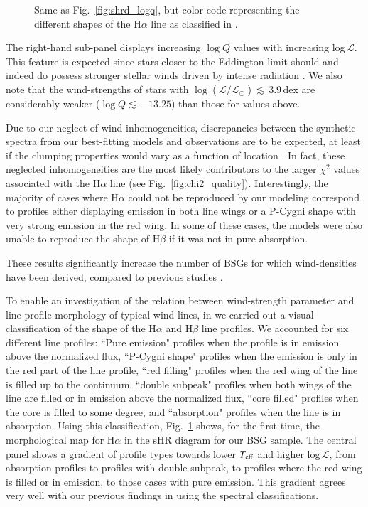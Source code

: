 \documentclass{aa}
\newcommand{\Teff}{\mbox{$T_{\rm eff}$}\xspace}
\newcommand{\logQ}{\mbox{$\log Q$}\xspace}
\newcommand{\logLs}{$\log (\mathcal{L}/\mathcal{L}_{\odot})$\xspace}
\newcommand{\Ls}{$ \mathcal{L}$\xspace}
\newcommand{\ls}{\mbox{$\lesssim$}\,}
\begin{document}
\begin{figure}[!t]
\centering
{}
\caption{Same as Fig.~\ref{fig:shrd_logq}, but color-code representing the different shapes of the H$\alpha$ line as classified in \citet[][see also labels within the bottom right inset]{deburgos23}.} 
\label{fig:shrd_logq_sep}
\end{figure}

The right-hand sub-panel displays increasing \logQ values with increasing log\,\Ls. This feature is expected since stars closer to the Eddington limit should and indeed do possess stronger stellar winds driven by intense radiation \citep[see, e.g.,][]{abbott80, pauldrach86}. We also note that the wind-strengths of stars with \logLs\ls3.9\,dex are considerably weaker (\logQ\ls$-13.25$) than those for values above.

Due to our neglect of wind inhomogeneities, discrepancies between the synthetic spectra from our best-fitting models and observations are to be expected, at least if the clumping properties would vary as a function of location \citep[which seems to be the case, e.g.,][]{najarro11}. In fact, these neglected inhomogeneities are the most likely contributors to the larger $\chi^{2}$ values associated with the H$\alpha$ line (see Fig.~\ref{fig:chi2_quality}). Interestingly, the majority of cases where H$\alpha$ could not be reproduced by our modeling correspond to profiles either displaying emission in both line wings or a P-Cygni shape with very strong emission in the red wing. In some of these cases, the models were also unable to reproduce the shape of H$\beta$ if it was not in pure absorption.

These results significantly increase the number of BSGs for which wind-densities have been derived, compared to previous studies \citep[see, e.g.,][]{markova08, haucke18}.

To enable an investigation of the relation between wind-strength parameter and line-profile morphology of typical wind lines, in \citet{deburgos23} we carried out a visual classification of the shape of the H$\alpha$ and H$\beta$ line profiles. We accounted for six different line profiles: ``Pure emission" profiles when the profile is in emission above the normalized flux, ``P-Cygni shape" profiles when the emission is only in the red part of the line profile, ``red filling" profiles when the red wing of the line is filled up to the continuum, ``double subpeak" profiles when both wings of the line are filled or in emission above the normalized flux, ``core filled" profiles when the core is filled to some degree, and ``absorption" profiles when the line is in absorption. Using this classification, Fig.~\ref{fig:shrd_logq_sep} shows, for the first time, the morphological map for H$\alpha$ in the sHR diagram for our BSG sample. The central panel shows a gradient of profile types towards lower \Teff and higher log\,\Ls, from absorption profiles to profiles with double subpeak, to profiles where the red-wing is filled or in emission, to those cases with pure emission. This gradient agrees very well with our previous findings in \citet{deburgos23} using the spectral classifications. 
\end{document}
